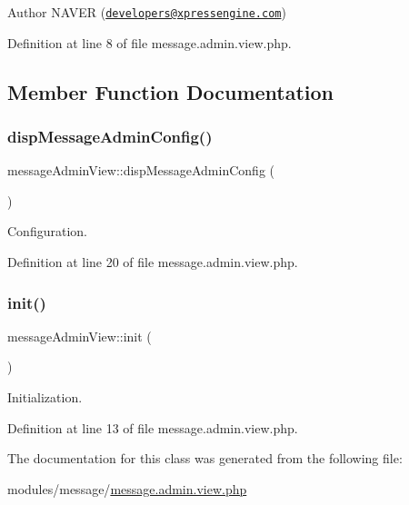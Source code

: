 \begin{DoxyAuthor}{Author}
N\+A\+V\+ER (\href{mailto:developers@xpressengine.com}{\tt developers@xpressengine.\+com}) 
\end{DoxyAuthor}


Definition at line 8 of file message.\+admin.\+view.\+php.



\subsection{Member Function Documentation}
\hypertarget{classmessageAdminView_a20b39513c151ef7ed99f72a4b219533c}{}\label{classmessageAdminView_a20b39513c151ef7ed99f72a4b219533c} 
\subsubsection{\texorpdfstring{disp\+Message\+Admin\+Config()}{dispMessageAdminConfig()}}
{\footnotesize\ttfamily message\+Admin\+View\+::disp\+Message\+Admin\+Config (\begin{DoxyParamCaption}{ }\end{DoxyParamCaption})}



Configuration. 



Definition at line 20 of file message.\+admin.\+view.\+php.

\hypertarget{classmessageAdminView_acfd2740e92846bc6d2be0433a73fcf9c}{}\label{classmessageAdminView_acfd2740e92846bc6d2be0433a73fcf9c} 
\subsubsection{\texorpdfstring{init()}{init()}}
{\footnotesize\ttfamily message\+Admin\+View\+::init (\begin{DoxyParamCaption}{ }\end{DoxyParamCaption})}



Initialization. 



Definition at line 13 of file message.\+admin.\+view.\+php.



The documentation for this class was generated from the following file\+:\begin{DoxyCompactItemize}
\item 
modules/message/\hyperlink{message_8admin_8view_8php}{message.\+admin.\+view.\+php}\end{DoxyCompactItemize}
